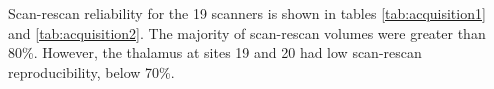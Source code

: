 Scan-rescan reliability for the 19 scanners is shown in tables \ref{tab:acquisition1} and \ref{tab:acquisition2}. The majority of scan-rescan volumes were greater than 80\%. However, the thalamus at sites 19 and 20 had low scan-rescan reproducibility, below 70\%. %